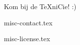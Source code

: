 \documentclass{cursuspresentatie}
\def\importslide#1#2{%
    {#2}
}
\begin{document}

















\begin{frame}
    \centering\LARGE
    Kom bij de \TeX niCie! :)
\end{frame}

\importslide{misc}{misc-contact.tex}


\ifishandout
    \importslide{misc}{misc-license.tex}
\fi
    
\end{document}

